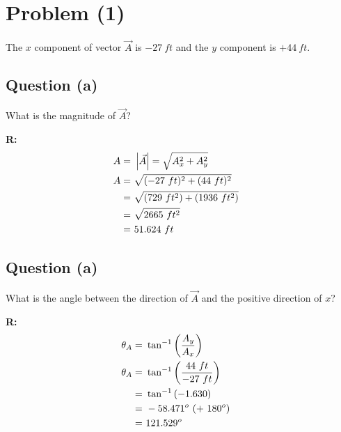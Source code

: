 \section{Problem (1)}
	The $x$ component of vector $\vec{A}$ is $-27 \ ft$ and the $y$ component is $+44 \ ft$.

	\subsection{Question (a)}

		What is the magnitude of $\vec{A}$?

		\textbf{R:} \newline
		\begin{align}
			A = \ &\left| \vec{A} \right| = \sqrt{A_{x}^{2} + A_{y}^{2}}& \notag \\
			A = \ &\sqrt{(-27 \ ft)^{2} + (44 \ ft)^{2}}& \notag \\
			= \ &\sqrt{(729 \ ft^{2}) + (1936 \ ft^{2})}& \notag \\
			= \ &\sqrt{2665 \ ft^{2}}& \notag \\
			= \ &51.624 \ ft&
		\end{align}

	\subsection{Question (a)}

		What is the angle between the direction of $\vec{A}$ and the positive direction of $x$?

		\textbf{R:} \newline
		\begin{align}
			\theta_{A} = \ &\tan^{-1} \left( \frac{A_{y}}{A_{x}} \right)& \notag \\
			\theta_{A} = \ &\tan^{-1} \left( \frac{44 \ ft}{-27 \ ft} \right)& \notag \\
			= \ &\tan^{-1} \left( -1.630 \right)& \notag \\
			= \ &-58.471^{o} \ (+ \ 180^{o})& \notag \\
			= \ &121.529^{o}&
		\end{align}
